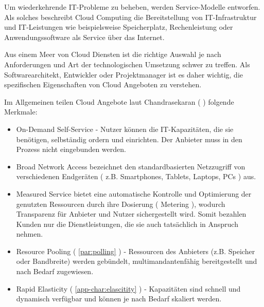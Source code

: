 \documentclass[
12pt,
english,
ngerman,
headsepline,
twoside,
openright,
numbers=noenddot,version=first
]{scrreprt}
\begin{document}
Um wiederkehrende IT-Probleme zu beheben, werden Service-Modelle entworfen. Als solches beschreibt
Cloud Computing die Bereitstellung von IT-Infrastruktur und IT-Leistungen wie beispielsweise Speicherplatz, Rechenleistung oder Anwendungssoftware als Service über das Internet.\cite{cloudEssentials}

\label{sec:cloud-char}
Aus einem Meer von Cloud Diensten ist die richtige Auswahl je nach Anforderungen und Art der technologischen Umsetzung schwer zu treffen. Als Softwarearchitekt, Entwickler oder Projektmanager ist es daher wichtig, die spezifischen Eigenschaften von Cloud Angeboten zu verstehen. 


Im Allgemeinen teilen Cloud Angebote laut Chandrasekaran ( \cite{cloudEssentials} ) folgende Merkmale:
\begin{itemize}
	\item On-Demand Self-Service - Nutzer können die IT-Kapazitäten, die sie benötigen, selbständig ordern und einrichten. Der Anbieter muss in den Prozess nicht eingebunden werden.
	\item Broad Network Access bezeichnet den standardbasierten Netzzugriff von verschiedenen Endgeräten ( z.B. Smartphones, Tablets, Laptops, PCs ) aus.
	\item Measured Service bietet eine automatische Kontrolle und Optimierung der genutzten Ressourcen durch ihre Dosierung ( Metering ), wodurch Transparenz für Anbieter und Nutzer sichergestellt wird. Somit bezahlen Kunden nur die Dienstleistungen, die sie auch tatsächlich in Anspruch nehmen.
	\item Resource Pooling ( \ref{par:polling} ) - Ressourcen des Anbieters (z.B. Speicher oder Bandbreite) werden gebündelt, multimandantenfähig bereitgestellt und nach Bedarf zugewiesen.
	\item Rapid Elasticity ( \autoref{app-char:elascitity} ) - Kapazitäten sind schnell und dynamisch verfügbar und können je nach Bedarf skaliert werden.
\end{itemize}
\end{document}
